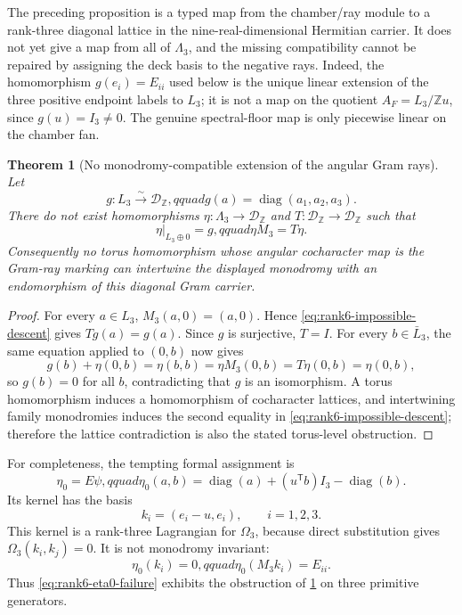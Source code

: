 \documentclass[11pt]{article}
\newtheorem{theorem}{Theorem}[section]
\theoremstyle{definition}
\theoremstyle{remark}
\numberwithin{equation}{section}
\begin{document}
The preceding proposition is a typed map from the chamber/ray module to a
rank-three diagonal lattice in the nine-real-dimensional Hermitian carrier.
It does not yet give a map from all of \(\Lambda_3\), and the missing
compatibility cannot be repaired by assigning the deck basis to the negative
rays.  Indeed, the homomorphism
\(g(e_i)=E_{ii}\) used below is the unique linear extension of the three
positive endpoint labels to \(L_3\); it is not a map on the quotient
\(A_F=L_3/\mathbb Zu\), since \(g(u)=I_3\ne0\).  The genuine spectral-floor
map is only piecewise linear on the chamber fan.

\begin{theorem}[No monodromy-compatible extension of the angular Gram rays]
\label{thm:rank6-monodromy-obstruction}
Let
\[
 g:L_3\xrightarrow{\sim}\mathscr D_{\mathbb Z},qquad
 g(a)=\operatorname{diag}(a_1,a_2,a_3).
\]
There do not exist homomorphisms
\(\eta:\Lambda_3\to\mathscr D_{\mathbb Z}\) and
\(T:\mathscr D_{\mathbb Z}\to\mathscr D_{\mathbb Z}\) such that
\begin{equation}
 \eta|_{L_3\oplus0}=g,qquad \eta M_3=T\eta.             \label{eq:rank6-impossible-descent}
\end{equation}
Consequently no torus homomorphism whose angular cocharacter map is the
Gram-ray marking can intertwine the displayed monodromy with an endomorphism
of this diagonal Gram carrier.
\end{theorem}

\begin{proof}
For every \(a\in L_3\), \(M_3(a,0)=(a,0)\).  Hence
\eqref{eq:rank6-impossible-descent} gives \(Tg(a)=g(a)\).  Since \(g\) is
surjective, \(T=I\).  For every \(b\in\bar L_3\), the same equation applied
to \((0,b)\) now gives
\[
 g(b)+\eta(0,b)=\eta(b,b)=\eta M_3(0,b)
 =T\eta(0,b)=\eta(0,b),
\]
so \(g(b)=0\) for all \(b\), contradicting that \(g\) is an isomorphism.
A torus homomorphism induces a homomorphism of cocharacter lattices, and
intertwining family monodromies induces the second equality in
\eqref{eq:rank6-impossible-descent}; therefore the lattice contradiction is
also the stated torus-level obstruction.
\end{proof}

For completeness, the tempting formal assignment is
\begin{equation}
 \eta_0=E\psi,qquad
 \eta_0(a,b)=\operatorname{diag}(a)
 +(u^{\mathsf T}b)I_3-\operatorname{diag}(b).            \label{eq:rank6-eta0}
\end{equation}
Its kernel has the basis
\begin{equation}
 k_i=(e_i-u,e_i),\qquad i=1,2,3.                         \label{eq:rank6-eta0-kernel}
\end{equation}
This kernel is a rank-three Lagrangian for \(\Omega_3\), because direct
substitution gives \(\Omega_3(k_i,k_j)=0\).  It is not monodromy invariant:
\begin{equation}
 \eta_0(k_i)=0,qquad \eta_0(M_3k_i)=E_{ii}.             \label{eq:rank6-eta0-failure}
\end{equation}
Thus \eqref{eq:rank6-eta0-failure} exhibits the obstruction of
\cref{thm:rank6-monodromy-obstruction} on three primitive generators.
\end{document}
